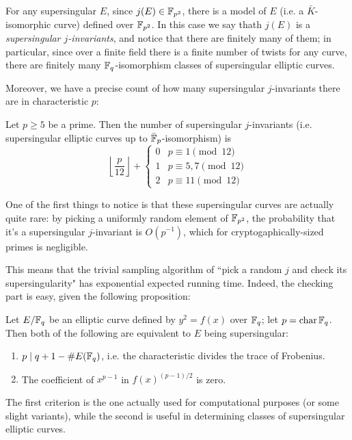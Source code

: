 For any supersingular $E$, since $j(E)\in\mathbb{F}_{p^2}$, there is a model of $E$ (i.e. a $\bar K$-isomorphic curve) defined over $\mathbb{F}_{p^2}$. In this case we say thath $j(E)$ is a \emph{supersingular $j$-invariants}, and notice that there are finitely many of them; in particular, since over a finite field there is a finite number of twists for any curve, there are finitely many $\mathbb{F}_q$-isomorphism classes of supersingular elliptic curves.

Moreover, we have a precise count of how many supersingular $j$-invariants there are in characteristic $p$:
\begin{theorem}
    Let $p\ge5$ be a prime. Then the number of supersingular $j$-invariants (i.e. supersingular elliptic curves up to $\bar{\mathbb{F}}_p$-isomorphism) is
    $$\left\lfloor \frac{p}{12} \right\rfloor + \begin{cases}
    0 & p\equiv1\pmod{12}\\
    1 & p\equiv5,7\pmod{12}\\
    2 & p\equiv11\pmod{12}
    \end{cases}$$
\end{theorem}

One of the first things to notice is that these supersingular curves are actually quite rare: by picking a uniformly random element of $\mathbb{F}_{p^2}$, the probability that it's a supersingular $j$-invariant is $O(p^{-1})$, which for cryptogaphically-sized primes is negligible.

This means that the trivial sampling algorithm of ``pick a random $j$ and check its supersingularity" has exponential expected running time. Indeed, the checking part is easy, given the following proposition:
\begin{proposition}
    Let $E/\mathbb{F}_q$ be an elliptic curve defined by $y^2=f(x)$ over $\mathbb{F}_q$; let $p=\operatorname{char}\mathbb{F}_q$. Then both of the following are equivalent to $E$ being supersingular:
    \begin{enumerate}
        \item $p\mid q+1-\# E(\mathbb{F}_q)$, i.e. the characteristic divides the trace of Frobenius.
        \item The coefficient of $x^{p-1}$ in $f(x)^{(p-1)/2}$ is zero.
    \end{enumerate}
\end{proposition}

The first criterion is the one actually used for computational purposes (or some slight variants), while the second is useful in determining classes of supersingular elliptic curves.

